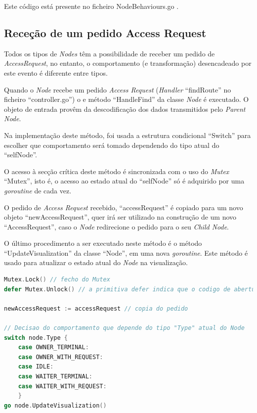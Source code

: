 Este código está presente no ficheiro NodeBehaviours.go .

\subsection*{Receção de um pedido Access Request}
Todos os tipos de \emph{Nodes} têm a possibilidade de receber um pedido de \emph{AccessRequest}, no entanto, o comportamento (e transformação) desencadeado por este evento é diferente entre tipos.

Quando o \emph{Node} recebe um pedido \emph{Access Request} (\emph{Handler} ``findRoute'' no ficheiro ``controller.go'') o
e método ``HandleFind'' da classe \emph{Node} é executado.
O objeto de entrada provêm da descodificação dos dados transmitidos pelo \emph{Parent Node}.

Na implementação deste método, foi usada a estrutura condicional ``Switch'' para escolher que comportamento será tomado 
dependendo do tipo atual do ``selfNode''.

O acesso à secção crítica deste método é sincronizada com o uso do \emph{Mutex} ``Mutex'', isto é,
o acesso ao estado atual do ``selfNode'' só é adquirido por uma \emph{goroutine} de cada vez.

O pedido de \emph{Access Request} recebido, ``accessRequest'' é copiado para um novo objeto ``newAccessRequest'',
quer irá ser utilizado na construção de um novo ``AccessRequest'',
caso o \emph{Node} redirecione o pedido para o seu \emph{Child Node}.

O último procedimento a ser executado neste método é o método ``UpdateVisualization'' da classe ``Node'', em uma nova \emph{goroutine}.
Este método é usado para atualizar o estado atual do \emph{Node} na visualização.

\begin{lstlisting}[caption={\emph{Switch} de decisão do comportamento.},language=Go]
Mutex.Lock() // fecho do Mutex
defer Mutex.Unlock() // a primitiva defer indica que o codigo de abertura do Mutex sera corrido caso a execucao deste metodo termine

newAccessRequest := accessRequest // copia do pedido

// Decisao do comportamento que depende do tipo "Type" atual do Node
switch node.Type {
	case OWNER_TERMINAL:
	case OWNER_WITH_REQUEST:
	case IDLE:
	case WAITER_TERMINAL:
	case WAITER_WITH_REQUEST:
	}
go node.UpdateVisualization()
\end{lstlisting}

